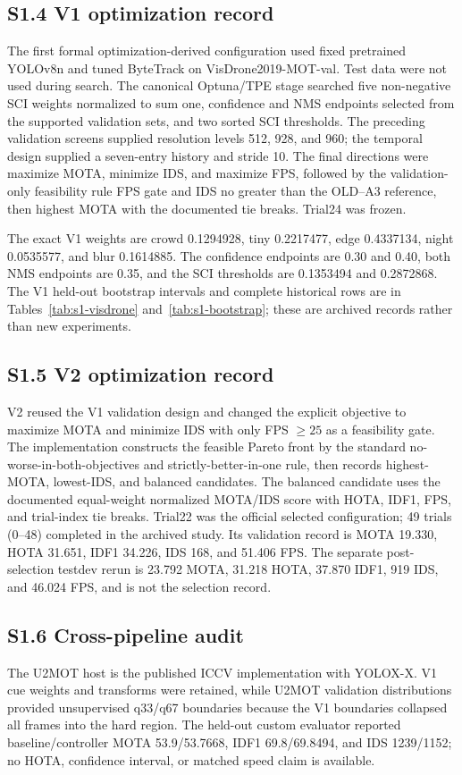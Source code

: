 \documentclass[11pt]{article}
\begin{document}
\subsection*{S1.4 V1 optimization record}
The first formal optimization-derived configuration used fixed pretrained
YOLOv8n and tuned ByteTrack on VisDrone2019-MOT-val. Test data were not used
during search. The canonical Optuna/TPE stage searched five non-negative SCI
weights normalized to sum one, confidence and NMS endpoints selected from the
supported validation sets, and two sorted SCI thresholds. The preceding
validation screens supplied resolution levels 512, 928, and 960; the temporal
design supplied a seven-entry history and stride 10. The final directions were
maximize MOTA, minimize IDS, and maximize FPS, followed by the validation-only
feasibility rule FPS gate and IDS no greater than the OLD--A3 reference, then
highest MOTA with the documented tie breaks. Trial24 was frozen.

The exact V1 weights are crowd 0.1294928, tiny 0.2217477, edge 0.4337134,
night 0.0535577, and blur 0.1614885. The confidence endpoints are 0.30 and
0.40, both NMS endpoints are 0.35, and the SCI thresholds are 0.1353494 and
0.2872868. The V1 held-out bootstrap intervals and complete historical rows
are in Tables~\ref{tab:s1-visdrone} and~\ref{tab:s1-bootstrap}; these are
archived records rather than new experiments.

\subsection*{S1.5 V2 optimization record}
V2 reused the V1 validation design and changed the explicit objective to
maximize MOTA and minimize IDS with only FPS $\geq25$ as a feasibility gate.
The implementation constructs the feasible Pareto front by the standard
no-worse-in-both-objectives and strictly-better-in-one rule, then records
highest-MOTA, lowest-IDS, and balanced candidates. The balanced candidate uses
the documented equal-weight normalized MOTA/IDS score with HOTA, IDF1, FPS,
and trial-index tie breaks. Trial22 was the official selected configuration;
49 trials (0--48) completed in the archived study. Its validation record is
MOTA 19.330, HOTA 31.651, IDF1 34.226, IDS 168, and 51.406 FPS. The separate
post-selection testdev rerun is 23.792 MOTA, 31.218 HOTA, 37.870 IDF1, 919
IDS, and 46.024 FPS, and is not the selection record.

\subsection*{S1.6 Cross-pipeline audit}
The U2MOT host is the published ICCV implementation with YOLOX-X. V1 cue
weights and transforms were retained, while U2MOT validation distributions
provided unsupervised q33/q67 boundaries because the V1 boundaries collapsed
all frames into the hard region. The held-out custom evaluator reported
baseline/controller MOTA 53.9/53.7668, IDF1 69.8/69.8494, and IDS 1239/1152;
no HOTA, confidence interval, or matched speed claim is available.
\end{document}
